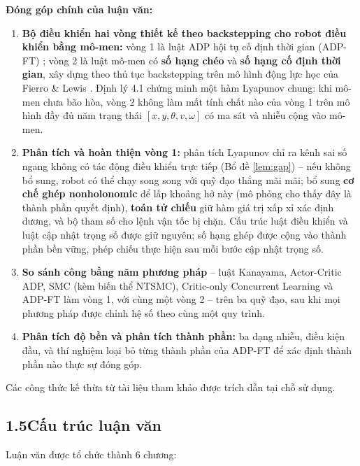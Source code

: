 \documentclass[12pt,a4paper]{article}
\begin{document}
\textbf{Đóng góp chính của luận văn:}
\begin{enumerate}
    \item \textbf{Bộ điều khiển hai vòng thiết kế theo backstepping cho robot điều khiển bằng mô-men:} vòng 1 là luật ADP hội tụ cố định thời gian (ADP-FT) \cite{Wang2025}; vòng 2 là luật mô-men có \textbf{số hạng chéo} và \textbf{số hạng cố định thời gian}, xây dựng theo thủ tục backstepping trên mô hình động lực học của Fierro \& Lewis \cite{Fierro1997}. Định lý 4.1 chứng minh một hàm Lyapunov chung: khi mô-men chưa bão hòa, vòng 2 không làm mất tính chất nào của vòng 1 trên mô hình đầy đủ năm trạng thái $[x, y, \theta, v, \omega]$ có ma sát và nhiễu cộng vào mô-men.

    \item \textbf{Phân tích và hoàn thiện vòng 1:} phân tích Lyapunov chỉ ra kênh sai số ngang không có tác động điều khiển trực tiếp (Bổ đề \ref{lem:gap}) -- nếu không bổ sung, robot có thể chạy song song với quỹ đạo thẳng mãi mãi; bổ sung \textbf{cơ chế ghép nonholonomic} để lấp khoảng hở này (mô phỏng cho thấy đây là thành phần quyết định), \textbf{toán tử chiếu} giữ hàm giá trị xấp xỉ xác định dương, và bộ tham số cho lệnh vận tốc bị chặn. Cấu trúc luật điều khiển và luật cập nhật trọng số được giữ nguyên; số hạng ghép được cộng vào thành phần bền vững, phép chiếu thực hiện sau mỗi bước cập nhật trọng số.

    \item \textbf{So sánh công bằng năm phương pháp} -- luật Kanayama, Actor-Critic ADP, SMC (kèm biến thể NTSMC), Critic-only Concurrent Learning và ADP-FT làm vòng 1, với cùng một vòng 2 -- trên ba quỹ đạo, sau khi mọi phương pháp được chỉnh hệ số theo cùng một quy trình.

    \item \textbf{Phân tích độ bền và phân tích thành phần:} ba dạng nhiễu, điều kiện đầu, và thí nghiệm loại bỏ từng thành phần của ADP-FT để xác định thành phần nào thực sự đóng góp.
\end{enumerate}

Các công thức kế thừa từ tài liệu tham khảo được trích dẫn tại chỗ sử dụng.

\subsection*{1.5\quad Cấu trúc luận văn}

Luận văn được tổ chức thành 6 chương:
\end{document}
